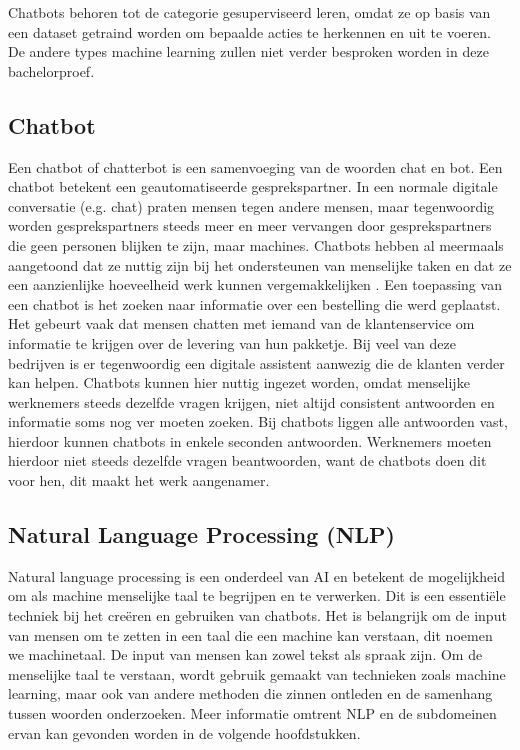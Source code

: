 Chatbots behoren tot de categorie gesuperviseerd leren, omdat ze op basis van een dataset getraind worden om bepaalde acties te herkennen en uit te voeren. De andere types machine learning zullen niet verder besproken worden in deze bachelorproef.

\subsection{Chatbot}
\label{subsec:begrippen-chatbot}

Een chatbot of chatterbot is een samenvoeging van de woorden chat en bot. Een chatbot betekent een geautomatiseerde gesprekspartner. In een normale digitale conversatie (e.g. chat) praten mensen tegen andere mensen, maar tegenwoordig worden gesprekspartners steeds meer en meer vervangen door gesprekspartners die geen personen blijken te zijn, maar machines. Chatbots hebben al meermaals aangetoond dat ze nuttig zijn bij het ondersteunen van menselijke taken en dat ze een aanzienlijke hoeveelheid werk kunnen vergemakkelijken \autocite{Atwell2007}. Een toepassing van een chatbot is het zoeken naar informatie over een bestelling die werd geplaatst. Het gebeurt vaak dat mensen chatten met iemand van de klantenservice om informatie te krijgen over de levering van hun pakketje. Bij veel van deze bedrijven is er tegenwoordig een digitale assistent aanwezig die de klanten verder kan helpen. Chatbots kunnen hier nuttig ingezet worden, omdat menselijke werknemers steeds dezelfde vragen krijgen, niet altijd consistent antwoorden en informatie soms nog ver moeten zoeken. Bij chatbots liggen alle antwoorden vast, hierdoor kunnen chatbots in enkele seconden antwoorden. Werknemers moeten hierdoor niet steeds dezelfde vragen beantwoorden, want de chatbots doen dit voor hen, dit maakt het werk aangenamer. 

\subsection{Natural Language Processing (NLP)}
\label{subsec:begrippen-nlp}


Natural language processing is een onderdeel van AI en betekent de mogelijkheid om als machine menselijke taal te begrijpen en te verwerken. Dit is een essentiële techniek bij het creëren en gebruiken van chatbots. Het is belangrijk om de input van mensen om te zetten in een taal die een machine kan verstaan, dit noemen we machinetaal. De input van mensen kan zowel tekst als spraak zijn. Om de menselijke taal te verstaan, wordt gebruik gemaakt van technieken zoals machine learning, maar ook van andere methoden die zinnen  ontleden en de samenhang tussen woorden onderzoeken. Meer informatie omtrent NLP en de subdomeinen ervan kan gevonden worden in de volgende hoofdstukken.


